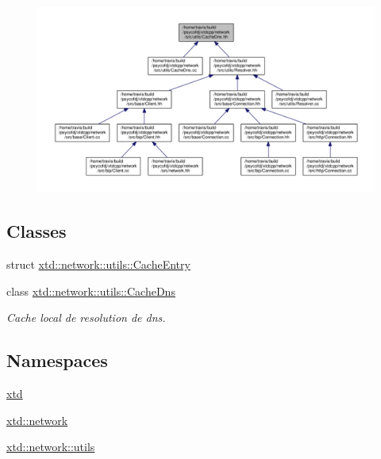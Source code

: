 \begin{figure}[H]
\begin{center}
\leavevmode
\includegraphics[width=350pt]{CacheDns_8hh__dep__incl}
\end{center}
\end{figure}
\subsection*{Classes}
\begin{DoxyCompactItemize}
\item 
struct \hyperlink{structxtd_1_1network_1_1utils_1_1CacheEntry}{xtd\-::network\-::utils\-::\-Cache\-Entry}
\item 
class \hyperlink{classxtd_1_1network_1_1utils_1_1CacheDns}{xtd\-::network\-::utils\-::\-Cache\-Dns}
\begin{DoxyCompactList}\small\item\em Cache local de resolution de dns. \end{DoxyCompactList}\end{DoxyCompactItemize}
\subsection*{Namespaces}
\begin{DoxyCompactItemize}
\item 
\hyperlink{namespacextd}{xtd}
\item 
\hyperlink{namespacextd_1_1network}{xtd\-::network}
\item 
\hyperlink{namespacextd_1_1network_1_1utils}{xtd\-::network\-::utils}
\end{DoxyCompactItemize}
